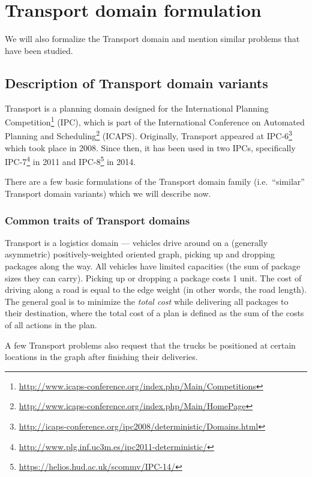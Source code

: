 \chapter{Transport domain formulation}

We will also formalize the Transport domain and mention similar problems that have been studied.


\section{Description of Transport domain variants}

Transport is a planning domain designed for
the International Planning
Competition\footnote{\url{http://www.icaps-conference.org/index.php/Main/Competitions}}
(IPC), which is part of the International Conference on Automated Planning and
Scheduling\footnote{\url{http://www.icaps-conference.org/index.php/Main/HomePage}} (ICAPS).
Originally, Transport appeared at 
IPC-6\footnote{\url{http://icaps-conference.org/ipc2008/deterministic/Domains.html}} which took place in 2008.
Since then, it has been used in two IPCs,
specifically IPC-7\footnote{\url{http://www.plg.inf.uc3m.es/ipc2011-deterministic/}} in 2011
and IPC-8\footnote{\url{https://helios.hud.ac.uk/scommv/IPC-14/}} in 2014.


There are a few basic formulations of the Transport domain family (i.e.~``similar'' Transport domain variants) which we will describe now.

\subsection{Common traits of Transport domains}

Transport is a logistics domain --- vehicles drive around on a (generally asymmetric) positively-weighted oriented graph, picking up and dropping packages along the way.
All vehicles have limited capacities (the sum of package sizes they can carry).
Picking up or dropping a package costs 1 unit. The cost of driving along a road is equal to the edge weight
(in other words, the road length).
The general goal is to minimize the \textit{total cost}
while delivering all packages to their destination, where
the total cost of a plan is defined as the sum of the costs of all actions in
the plan.

A few Transport problems also request that the trucks be positioned at certain
locations in the graph
after finishing their deliveries.

